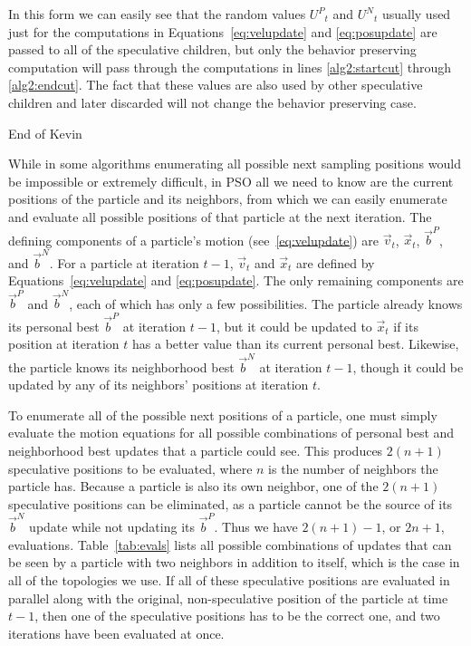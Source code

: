 \documentclass[journal,letterpaper]{IEEEtran}
\providecommand{\pers}{\ensuremath{P}}
\providecommand{\neigh}{\ensuremath{N}}
\providecommand{\nURand}{\ensuremath{U^\neigh}}
\providecommand{\pURand}{\ensuremath{U^\pers}}
\providecommand{\ppos}{\ensuremath{\Vec{x}}}
\providecommand{\pvel}{\ensuremath{\Vec{v}}}
\providecommand{\nbest}{\ensuremath{\Vec{b}^\neigh}}
\providecommand{\pbest}{\ensuremath{\Vec{b}^\pers}}
\begin{document}
In this form we can easily see that the random values
$\pURand_{t}$ and $\nURand_{t}$ usually used just for the computations in
Equations~\eqref{eq:velupdate} and \eqref{eq:posupdate} are passed to all of the
speculative children, but only the behavior preserving computation will
pass through the computations in lines
\ref{alg2:startcut} through
\ref{alg2:endcut}. The fact that these values are also used by other speculative
children and later discarded will not change the behavior preserving case.

End of Kevin

While in some algorithms enumerating all possible next sampling positions would
be impossible or extremely difficult, in PSO all we need to know are the
current positions of the particle and its neighbors, from which we can easily
enumerate and evaluate all possible positions of that particle at the next
iteration.  The defining components of a particle's motion
(see~\eqref{eq:velupdate}) are $\pvel_t$, $\ppos_t$, $\pbest$, and $\nbest$.
For a particle at iteration $t-1$, $\pvel_t$ and $\ppos_t$ are defined by
Equations~\eqref{eq:velupdate} and \eqref{eq:posupdate}.  The only remaining
components are $\pbest$ and $\nbest$, each of which has only a few
possibilities.  The particle already knows its personal best $\pbest$ at
iteration $t-1$, but it could be updated to $\ppos_t$ if its position at
iteration $t$ has a better value than its current personal best.  Likewise, the
particle knows its neighborhood best $\nbest$ at iteration $t-1$, though it
could be updated by any of its neighbors' positions at iteration $t$.

To enumerate all of the possible next positions of a particle, one must simply
evaluate the motion equations for all possible combinations of personal best
and neighborhood best updates that a particle could see.  This produces
$2(n+1)$ speculative positions to be evaluated, where $n$ is the number of
neighbors the particle has.  Because a particle is also its own neighbor, one
of the $2(n+1)$ speculative positions can be eliminated, as a particle cannot
be the source of its $\nbest$ update while not updating its $\pbest$.  Thus we
have $2(n+1)-1$, or $2n+1$, evaluations.  Table~\ref{tab:evals} lists all
possible combinations of updates that can be seen by a particle with two
neighbors in addition to itself, which is the case in all of the topologies we
use.  If all of these speculative positions are evaluated in parallel along
with the original, non-speculative position of the particle at time $t-1$, then
one of the speculative positions has to be the correct one, and two iterations
have been evaluated at once.
\end{document}

